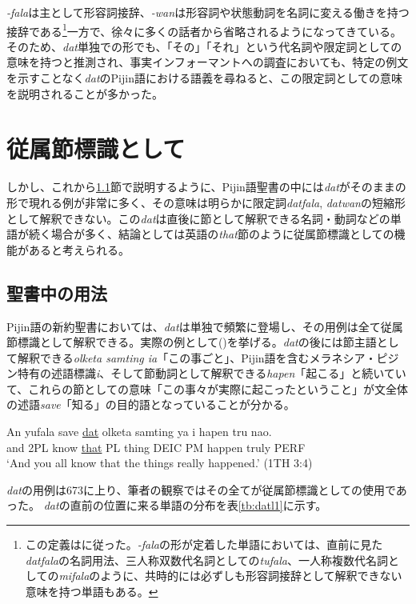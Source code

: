 \textit{-fala}は主として形容詞接辞、\textit{-wan}は形容詞や状態動詞を名詞に変える働きを持つ接辞である\footnote{この定義は\cite{syntax}に従った。\textit{-fala}の形が定着した単語においては、直前に見た\textit{datfala}の名詞用法、三人称双数代名詞としての\textit{tufala}、一人称複数代名詞としての\textit{mifala}のように、共時的には必ずしも形容詞接辞として解釈できない意味を持つ単語もある。}一方で、徐々に多くの話者から省略されるようになってきている\citep{syntax}。
そのため、\textit{dat}単独での形でも、「その」「それ」という代名詞や限定詞としての意味を持つと推測され、事実インフォーマントへの調査においても、特定の例文を示すことなく\textit{dat}のPijin語における語義を尋ねると、この限定詞としての意味を説明されることが多かった。

\section{従属節標識として}

しかし、これから\ref{sec:datbib}節で説明するように、Pijin語聖書の中には\textit{dat}がそのままの形で現れる例が非常に多く、その意味は明らかに限定詞\textit{datfala}, \textit{datwan}の短縮形として解釈できない。この\textit{dat}は直後に節として解釈できる名詞・動詞などの単語が続く場合が多く、結論としては英語の\textit{that}節のように従属節標識としての機能があると考えられる。

\subsection{聖書中の用法}\label{sec:datbib}
Pijin語の新約聖書においては、\textit{dat}は単独で頻繁に登場し、その用例は全て従属節標識として解釈できる。実際の例として()を挙げる。\textit{dat}の後には節主語として解釈できる\textit{olketa samting ia}「この事ごと」、Pijin語を含むメラネシア・ピジン特有の述語標識\textit{i}、そして節動詞として解釈できる\textit{hapen}「起こる」と続いていて、これらの節としての意味「この事々が実際に起こったということ」が文全体の述語\textit{save}「知る」の目的語となっていることが分かる。

\begin{exe}
\ex
\gll An yufala save \underline{dat} olketa samting ya i hapen tru nao.\\
and 2PL know \underline{that} PL thing DEIC PM happen truly PERF\\
\glt `And you all know that the things really happened.' (1TH 3:4)
\end{exe}

\textit{dat}の用例は673に上り、筆者の観察ではその全てが従属節標識としての使用であった。
\textit{dat}の直前の位置に来る単語の分布を表\ref{tb:datl1}に示す。

